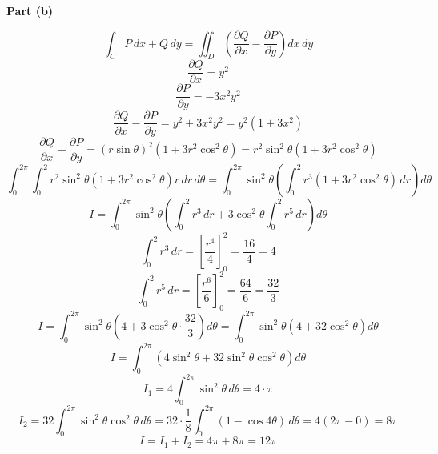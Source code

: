 \documentclass{report}
\begin{document}
{\textbf{Part (b)}

    \[ \int_{C} P\,dx + Q\,dy = \iint_{D} \left( \frac{\partial Q}{\partial x} - \frac{\partial P}{\partial y} \right) dx\,dy \]
    \[ \frac{\partial Q}{\partial x} = y^2 \]
    \[ \frac{\partial P}{\partial y} = -3x^2 y^2 \]
    \[ \frac{\partial Q}{\partial x} - \frac{\partial P}{\partial y} = y^2 + 3x^2 y^2 = y^2 (1 + 3x^2) \]
    \[ \frac{\partial Q}{\partial x} - \frac{\partial P}{\partial y} = (r\sin\theta)^2 \left(1 + 3r^2 \cos^2\theta\right) = r^2 \sin^2\theta \left(1 + 3r^2 \cos^2\theta\right) \]
    \[ \int_{0}^{2\pi} \int_{0}^{2} r^2 \sin^2\theta \left(1 + 3r^2 \cos^2\theta\right) r\,dr\,d\theta = \int_{0}^{2\pi} \sin^2\theta \left( \int_{0}^{2} r^3 (1 + 3r^2 \cos^2\theta)\,dr \right) d\theta \]
    \[ I = \int_{0}^{2\pi} \sin^2\theta \left( \int_{0}^{2} r^3\,dr + 3\cos^2\theta \int_{0}^{2} r^5\,dr \right) d\theta \]
    \[ \int_{0}^{2} r^3\,dr = \left[ \frac{r^4}{4} \right]_0^2 = \frac{16}{4} = 4 \]
    \[ \int_{0}^{2} r^5\,dr = \left[ \frac{r^6}{6} \right]_0^2 = \frac{64}{6} = \frac{32}{3} \]
    \[ I = \int_{0}^{2\pi} \sin^2\theta \left( 4 + 3\cos^2\theta \cdot \frac{32}{3} \right) d\theta = \int_{0}^{2\pi} \sin^2\theta \left(4 + 32\cos^2\theta \right) d\theta \]
    \[ I = \int_{0}^{2\pi} \left( 4\sin^2\theta + 32\sin^2\theta \cos^2\theta \right) d\theta \]
    \[ I_1 = 4 \int_{0}^{2\pi} \sin^2\theta\,d\theta = 4 \cdot \pi \]
    \[ I_2 = 32 \int_{0}^{2\pi} \sin^2\theta \cos^2\theta\,d\theta = 32 \cdot \frac{1}{8} \int_{0}^{2\pi} (1 - \cos 4\theta)\,d\theta = 4 \left( 2\pi - 0 \right) = 8\pi \]
    \[ I = I_1 + I_2 = 4\pi + 8\pi = \boxed{12\pi} \]
}


\end{document}
